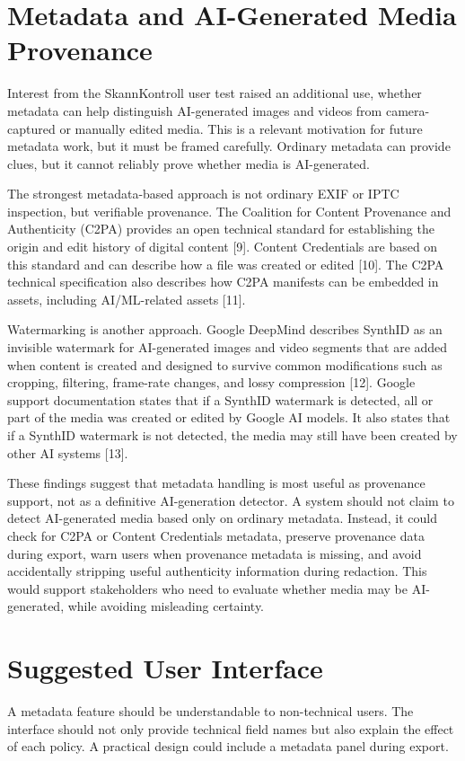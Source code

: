 \section{Metadata and AI-Generated Media Provenance}
Interest from the SkannKontroll user test raised an additional use, whether metadata can help distinguish AI-generated images and videos from camera-captured or manually edited media. This is a relevant motivation for future metadata work, but it must be framed carefully. Ordinary metadata can provide clues, but it cannot reliably prove whether media is AI-generated.

The strongest metadata-based approach is not ordinary EXIF or IPTC inspection, but verifiable provenance. The Coalition for Content Provenance and Authenticity (C2PA) provides an open technical standard for establishing the origin and edit history of digital content [9]. Content Credentials are based on this standard and can describe how a file was created or edited [10]. The C2PA technical specification also describes how C2PA manifests can be embedded in assets, including AI/ML-related assets [11].

Watermarking is another approach. Google DeepMind describes SynthID as an invisible watermark for AI-generated images and video segments that are added when content is created and designed to survive common modifications such as cropping, filtering, frame-rate changes, and lossy compression [12]. Google support documentation states that if a SynthID watermark is detected, all or part of the media was created or edited by Google AI models. It also states that if a SynthID watermark is not detected, the media may still have been created by other AI systems [13].

These findings suggest that metadata handling is most useful as provenance support, not as a definitive AI-generation detector. A system should not claim to detect AI-generated media based only on ordinary metadata. Instead, it could check for C2PA or Content Credentials metadata, preserve provenance data during export, warn users when provenance metadata is missing, and avoid accidentally stripping useful authenticity information during redaction. This would support stakeholders who need to evaluate whether media may be AI-generated, while avoiding misleading certainty.

\section{Suggested User Interface}
A metadata feature should be understandable to non-technical users. The interface should not only provide technical field names but also explain the effect of each policy. A practical design could include a metadata panel during export.


